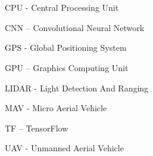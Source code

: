\section*{} 

CPU     -   Central Processing Unit

CNN		– 	Convolutional Neural Network 

GPS     -   Global Positioning System

GPU     –  	Graphics Computing Unit

LIDAR   -   Light Detection And Ranging

MAV     -   Micro Aerial Vehicle

TF		–	TensorFlow

UAV     -   Unmanned Aerial Vehicle